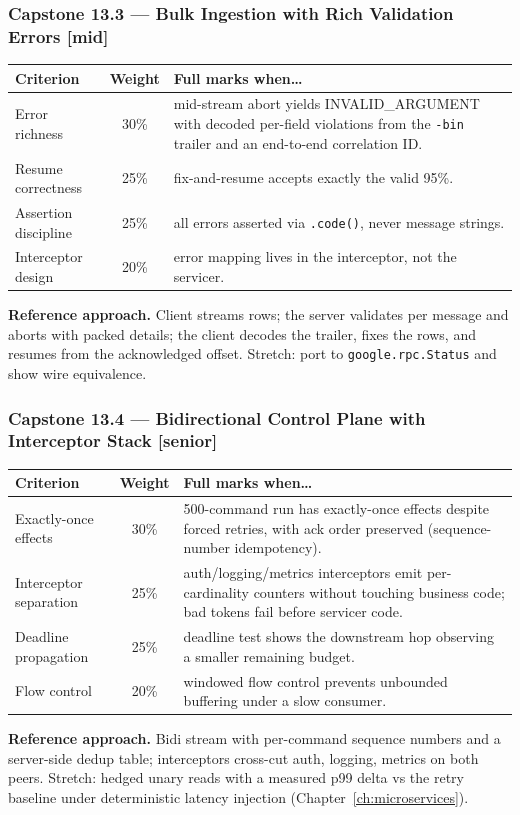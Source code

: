 \subsubsection*{Capstone 13.3 --- Bulk Ingestion with Rich Validation Errors [mid]}
\begin{center}\small
\begin{tabularx}{\textwidth}{l c X}
\toprule
\textbf{Criterion} & \textbf{Weight} & \textbf{Full marks when\ldots} \\
\midrule
Error richness & 30\% & mid-stream abort yields INVALID\_ARGUMENT with decoded per-field violations from the \texttt{-bin} trailer and an end-to-end correlation ID. \\
Resume correctness & 25\% & fix-and-resume accepts exactly the valid 95\%. \\
Assertion discipline & 25\% & all errors asserted via \texttt{.code()}, never message strings. \\
Interceptor design & 20\% & error mapping lives in the interceptor, not the servicer. \\
\bottomrule
\end{tabularx}
\end{center}
\textbf{Reference approach.} Client streams rows; the server validates per
message and aborts with packed details; the client decodes the trailer,
fixes the rows, and resumes from the acknowledged offset. Stretch: port to
\texttt{google.rpc.Status} and show wire equivalence.

\subsubsection*{Capstone 13.4 --- Bidirectional Control Plane with Interceptor Stack [senior]}
\begin{center}\small
\begin{tabularx}{\textwidth}{l c X}
\toprule
\textbf{Criterion} & \textbf{Weight} & \textbf{Full marks when\ldots} \\
\midrule
Exactly-once effects & 30\% & 500-command run has exactly-once effects despite forced retries, with ack order preserved (sequence-number idempotency). \\
Interceptor separation & 25\% & auth/logging/metrics interceptors emit per-cardinality counters without touching business code; bad tokens fail before servicer code. \\
Deadline propagation & 25\% & deadline test shows the downstream hop observing a smaller remaining budget. \\
Flow control & 20\% & windowed flow control prevents unbounded buffering under a slow consumer. \\
\bottomrule
\end{tabularx}
\end{center}
\textbf{Reference approach.} Bidi stream with per-command sequence numbers
and a server-side dedup table; interceptors cross-cut auth, logging,
metrics on both peers. Stretch: hedged unary reads with a measured p99
delta vs the retry baseline under deterministic latency injection
(Chapter~\ref{ch:microservices}).

